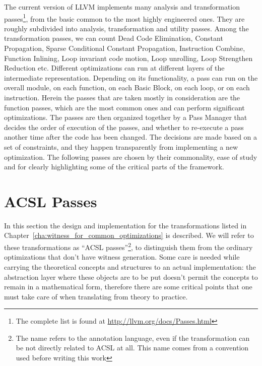 The current version of LLVM implements many analysis and transformation passes\footnote{The complete list is found at \url{http://llvm.org/docs/Passes.html}}, from the basic common to the most highly engineered ones. They are roughly subdivided into analysis, transformation and utility passes. Among the transformation passes, we can count Dead Code Elimination, Constant Propagation, Sparse Conditional Constant Propagation, Instruction Combine, Function Inlining, Loop invariant code motion, Loop unrolling, Loop Strengthen Reduction etc. Different optimizations can run at different layers of the intermediate representation. Depending on its functionality, a pass can run on the overall module, on each function, on each Basic Block, on each loop, or on each instruction. Herein the passes that are taken mostly in consideration are the function passes, which are the most common ones and can perform significant optimizations. The passes are then organized together by a Pass Manager that decides the order of execution of the passes, and whether to re-execute a pass another time after the code has been changed. The decisions are made based on a set of constraints, and they happen transparently from implementing a new optimization. The following passes are chosen by their commonality, ease of study and for clearly highlighting some of the critical parts of the framework.

\section{ACSL Passes}
\label{sec:acsl_passes}

In this section the design and implementation for the transformations listed in Chapter~\ref{cha:witness_for_common_optimizations} is described. We will refer to these transformations as ``ACSL passes''\footnote{The name refers to the annotation language, even if the transformation can be not directly related to ACSL at all. This name comes from a convention used before writing this work}, to distinguish them from the ordinary optimizations that don't have witness generation. Some care is needed while carrying the theoretical concepts and structures to an actual implementation: the abstraction layer where these objects are to be put doesn't permit the concepts to remain in a mathematical form, therefore there are some critical points that one must take care of when translating from theory to practice.

